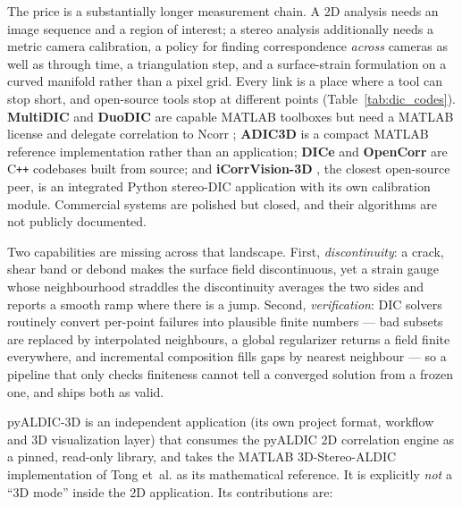 The price is a substantially longer measurement chain. A 2D analysis needs an image sequence and a region of interest; a stereo analysis additionally needs a metric camera calibration, a policy for finding correspondence \emph{across} cameras as well as through time, a triangulation step, and a surface-strain formulation on a curved manifold rather than a pixel grid. Every link is a place where a tool can stop short, and open-source tools stop at different points (Table~\ref{tab:dic_codes}). \textbf{MultiDIC} \cite{solav2018multidic} and \textbf{DuoDIC} \cite{solav2022duodic} are capable MATLAB toolboxes but need a MATLAB license and delegate correlation to Ncorr \cite{blaber2015ncorr}; \textbf{ADIC3D} \cite{atkinson2021adic3d} is a compact MATLAB reference implementation rather than an application; \textbf{DICe} \cite{turner2015dice,turner2017dicestereo} and \textbf{OpenCorr} \cite{jiang2023opencorr} are C\texttt{++} codebases built from source; and \textbf{iCorrVision-3D} \cite{filho2022icorrvision3d}, the closest open-source peer, is an integrated Python stereo-DIC application with its own calibration module. Commercial systems \cite{vic3d_software,matchid_software,gom_aramis_software} are polished but closed, and their algorithms are not publicly documented.

Two capabilities are missing across that landscape. First, \emph{discontinuity}: a crack, shear band or debond makes the surface field discontinuous, yet a strain gauge whose neighbourhood straddles the discontinuity averages the two sides and reports a smooth ramp where there is a jump. Second, \emph{verification}: DIC solvers routinely convert per-point failures into plausible finite numbers --- bad subsets are replaced by interpolated neighbours, a global regularizer returns a field finite everywhere, and incremental composition fills gaps by nearest neighbour --- so a pipeline that only checks finiteness cannot tell a converged solution from a frozen one, and ships both as valid.

pyALDIC-3D is an independent application (its own project format, workflow and 3D visualization layer) that consumes the pyALDIC 2D correlation engine \cite{tong2026pyaldic} as a pinned, read-only library, and takes the MATLAB 3D-Stereo-ALDIC implementation of Tong et~al. \cite{tong2025stereo} as its mathematical reference. It is explicitly \emph{not} a ``3D mode'' inside the 2D application. Its contributions are:

